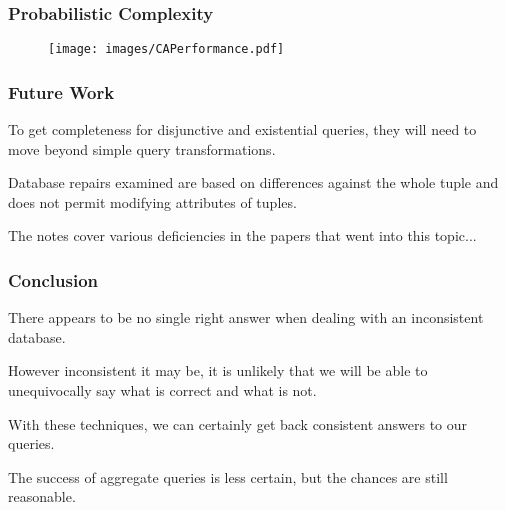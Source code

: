 \begin{frame}
\frametitle{Probabilistic Complexity}

\begin{figure}[!h]
  \centering \texttt{[image: images/CAPerformance.pdf]}
\end{figure}


\end{frame}


\begin{frame}
\frametitle{Future Work}

To get completeness for disjunctive and existential queries, they will need to move beyond simple query transformations.

Database repairs examined are based on differences against the whole tuple and does not permit modifying attributes of tuples.

The notes cover various deficiencies in the papers that went into this topic...

\end{frame}


\begin{frame}
\frametitle{Conclusion}

There appears to be no single right answer when dealing with an inconsistent database. 

However inconsistent it may be, it is unlikely that we will be able to unequivocally say what is correct and what is not. 

With these techniques, we can certainly get back consistent answers to our queries. 

The success of aggregate queries is less certain, but the chances are still reasonable.


\end{frame}








